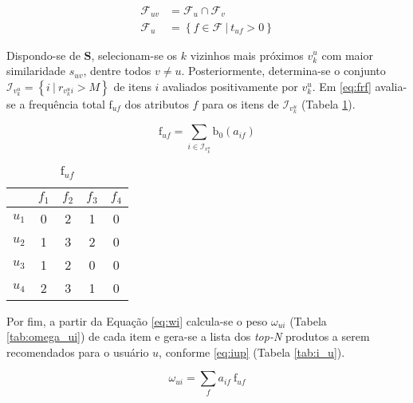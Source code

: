 \begin{equation}
\label{eq:fuv}
\begin{split}
    \mathcal{F}_{uv} &= \mathcal{F}_u \cap \mathcal{F}_v \\
    \mathcal{F}_u &= \left\{ f \in \mathcal{F}~|~t_{uf} > 0 \right\}
\end{split}    
\end{equation} 

Dispondo-se de $\mathbf{S}$, selecionam-se os $k$ vizinhos mais próximos $v_k^u$ com maior similaridade $s_{uv}$, dentre todos $v \neq u$.  Posteriormente, determina-se o conjunto $\mathcal{I}_{v_k^u} = \left\{ i ~|~ r_{v_k^u i} > M\right\}$ de itens $i$ avaliados positivamente por $v_k^u$. Em \ref{eq:frf} avalia-se a frequência total $\mathrm{f}_{uf}$ dos atributos $f$ para os itens de $\mathcal{I}_{v_k^u}$ (Tabela \ref{tab:f_uf}). 

\begin{equation}
\label{eq:frf} 
\mathrm{f}_{uf} = \sum_{i \in \mathcal{I}_{v_k^u}}{\mathrm{b}_0\left(a_{if}\right)}
\end{equation} 

\begin{table}[p]
\begin{center}
    \caption{$\mathrm{f}_{uf}$}
    \label{tab:f_uf}
    \begin{tabular}{ | c | c | c | c | c | } 
    \hline
     & $f_1$ & $f_2$ & $f_3$ & $f_4$   \\ \hline
     $u_1$ & 0 & 2 & 1 & 0  \\ \hline
     $u_2$ & 1 & 3 & 2 & 0  \\ \hline
     $u_3$ & 1 & 2 & 0 & 0  \\ \hline
     $u_4$ & 2 & 3 & 1 & 0  \\ \hline
    \end{tabular}
\end{center}
\end{table}

Por fim, a partir da Equação \ref{eq:wi} calcula-se o peso $\omega_{ui}$ (Tabela \ref{tab:omega_ui}) de cada item e gera-se a lista dos \textit{top-N} produtos a serem recomendados para o usuário $u$, conforme \ref{eq:iup} (Tabela \ref{tab:i_u}). 

\begin{equation}
\label{eq:wi} 
    \omega_{ui} = \sum_{f}{a_{if}~\mathrm{f}_{uf}}
\end{equation} 


